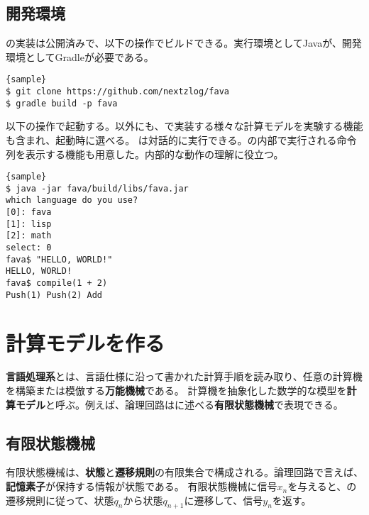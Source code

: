 \documentclass[10pt,a4paper]{book}
\begin{document}
\section{開発環境}

\fava{}の実装は公開済みで、以下の操作でビルドできる。実行環境としてJavaが、開発環境としてGradleが必要である。

\begin{Verbatim}{sample}
$ git clone https://github.com/nextzlog/fava
$ gradle build -p fava
\end{Verbatim}

以下の操作で起動する。\fava{}以外にも、で実装する様々な計算モデルを実験する機能も含まれ、起動時に選べる。
\fava{}は対話的に実行できる。\fava{}の内部で実行される命令列を表示する機能も用意した。内部的な動作の理解に役立つ。

\begin{Verbatim}{sample}
$ java -jar fava/build/libs/fava.jar
which language do you use?
[0]: fava
[1]: lisp
[2]: math
select: 0
fava$ "HELLO, WORLD!"
HELLO, WORLD!
fava$ compile(1 + 2)
Push(1) Push(2) Add
\end{Verbatim}

\chapter{計算モデルを作る\label{chap:automata}}

\textbf{言語処理系}とは、言語仕様に沿って書かれた計算手順を読み取り、任意の計算機を構築または模倣する\textbf{万能機械}である。
計算機を抽象化した数学的な模型を\textbf{計算モデル}と呼ぶ。例えば、論理回路はに述べる\textbf{有限状態機械}で表現できる。

\section{有限状態機械\label{sect:regex}}

有限状態機械は、\textbf{状態}と\textbf{遷移規則}の有限集合で構成される。論理回路で言えば、\textbf{記憶素子}が保持する情報が状態である。
有限状態機械に信号$x_n$を与えると、の遷移規則に従って、状態$q_n$から状態$q_{n+1}$に遷移して、信号$y_n$を返す。
\end{document}
